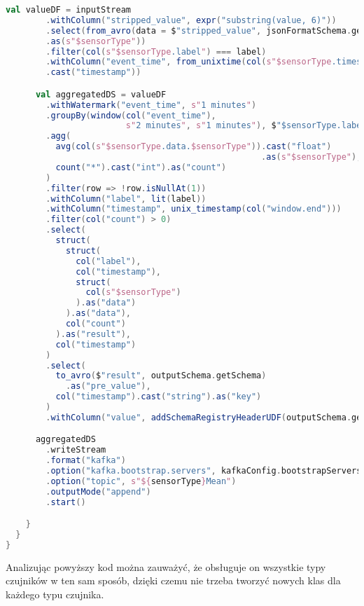 \begin{lstlisting}[caption={Implementacja w klasie MeanProcessor za pomocą Apache Spark}, label={lst:mean_processor_spark},language=Scala]
      val valueDF = inputStream
        .withColumn("stripped_value", expr("substring(value, 6)"))
        .select(from_avro(data = $"stripped_value", jsonFormatSchema.getSchema)
        .as(s"$sensorType"))
        .filter(col(s"$sensorType.label") === label)
        .withColumn("event_time", from_unixtime(col(s"$sensorType.timestamp"))
        .cast("timestamp"))

      val aggregatedDS = valueDF
        .withWatermark("event_time", s"1 minutes")
        .groupBy(window(col("event_time"), 
                        s"2 minutes", s"1 minutes"), $"$sensorType.label")
        .agg(
          avg(col(s"$sensorType.data.$sensorType")).cast("float")
                                                   .as(s"$sensorType"),
          count("*").cast("int").as("count")
        )
        .filter(row => !row.isNullAt(1))
        .withColumn("label", lit(label))
        .withColumn("timestamp", unix_timestamp(col("window.end")))
        .filter(col("count") > 0)
        .select(
          struct(
            struct(
              col("label"),
              col("timestamp"),
              struct(
                col(s"$sensorType")
              ).as("data")
            ).as("data"),
            col("count")
          ).as("result"),
          col("timestamp")
        )
        .select(
          to_avro($"result", outputSchema.getSchema)
            .as("pre_value"),
          col("timestamp").cast("string").as("key")
        )
        .withColumn("value", addSchemaRegistryHeaderUDF(outputSchema.getId)(col("pre_value")))

      aggregatedDS
        .writeStream
        .format("kafka")
        .option("kafka.bootstrap.servers", kafkaConfig.bootstrapServers)
        .option("topic", s"${sensorType}Mean")
        .outputMode("append")
        .start()

    }
  }
} 

\end{lstlisting}

Analizując powyższy kod można zauważyć, że obsługuje on wszystkie typy czujników w ten sam sposób, dzięki czemu nie trzeba tworzyć nowych klas dla każdego typu czujnika.


